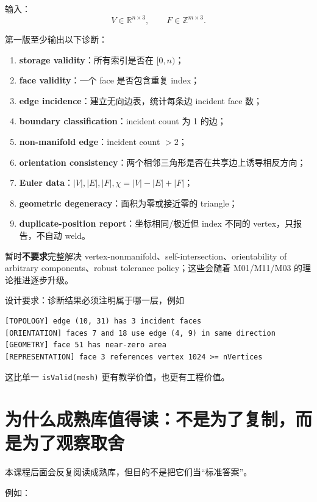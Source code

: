 \documentclass[UTF8,11pt]{ctexart}
\newcommand{\code}[1]{\texttt{#1}}
\begin{document}
\begin{codingexercise}
输入：
\[
V\in\mathbb R^{n\times 3},\qquad F\in\mathbb Z^{m\times 3}.
\]

第一版至少输出以下诊断：

\begin{enumerate}
  \item \textbf{storage validity}：所有索引是否在 $[0,n)$；
  \item \textbf{face validity}：一个 face 是否包含重复 index；
  \item \textbf{edge incidence}：建立无向边表，统计每条边 incident face 数；
  \item \textbf{boundary classification}：incident count 为 1 的边；
  \item \textbf{non-manifold edge}：incident count $>2$；
  \item \textbf{orientation consistency}：两个相邻三角形是否在共享边上诱导相反方向；
  \item \textbf{Euler data}：$|V|,|E|,|F|,\chi=|V|-|E|+|F|$；
  \item \textbf{geometric degeneracy}：面积为零或接近零的 triangle；
  \item \textbf{duplicate-position report}：坐标相同/极近但 index 不同的 vertex，只报告，不自动 weld。
\end{enumerate}

暂时\textbf{不要求}完整解决 vertex-nonmanifold、self-intersection、orientability of arbitrary components、robust tolerance policy；这些会随着 M01/M11/M03 的理论推进逐步升级。

设计要求：诊断结果必须注明属于哪一层，例如
\begin{lstlisting}
[TOPOLOGY] edge (10, 31) has 3 incident faces
[ORIENTATION] faces 7 and 18 use edge (4, 9) in same direction
[GEOMETRY] face 51 has near-zero area
[REPRESENTATION] face 3 references vertex 1024 >= nVertices
\end{lstlisting}

这比单一 \code{isValid(mesh)} 更有教学价值，也更有工程价值。
\end{codingexercise}

\section{为什么成熟库值得读：不是为了复制，而是为了观察取舍}

本课程后面会反复阅读成熟库，但目的不是把它们当“标准答案”。

例如：
\end{document}
